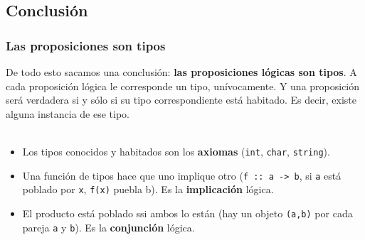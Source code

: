 \documentclass{beamer}
\begin{document}

  \subsection{Conclusión}
    \begin{frame}
      \frametitle{Las proposiciones son tipos}
      De todo esto sacamos una conclusión: \textbf{las proposiciones lógicas son tipos}. 
      A cada proposición lógica le corresponde un tipo, unívocamente. 
      Y una proposición será verdadera si y sólo si su tipo correspondiente está
      habitado. Es decir, existe alguna instancia de ese tipo. \\~\\
      
      \begin{itemize}
       \item Los tipos conocidos y habitados son los \textbf{axiomas} (\texttt{int}, \texttt{char}, \texttt{string}).
       \item Una función de tipos hace que uno implique otro (\texttt{f :: a -> b}, si \texttt{a} está poblado por \texttt{x}, \texttt{f(x)} puebla b).
	Es la \textbf{implicación} lógica.
       \item El producto está poblado ssi ambos lo están (hay un objeto \texttt{(a,b)} por cada pareja \texttt{a} y \texttt{b}).
	Es la \textbf{conjunción} lógica.
      \end{itemize}
      
    \end{frame}
    
  
\end{document}
